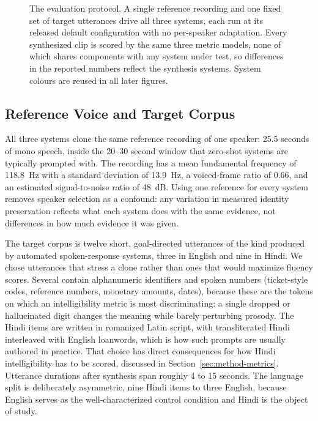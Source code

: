 \documentclass[conference]{IEEEtran}
\begin{document}
\begin{figure}[t]
\caption{The evaluation protocol. A single reference recording and one fixed
set of target utterances drive all three systems, each run at its released
default configuration with no per-speaker adaptation. Every synthesized clip
is scored by the same three metric models, none of which shares components
with any system under test, so differences in the reported numbers reflect
the synthesis systems. System colours are reused in all later figures.}
\label{fig:pipeline}
\end{figure}

\subsection{Reference Voice and Target Corpus}
\label{sec:method-corpus}

All three systems clone the same reference recording of one speaker: 25.5
seconds of mono speech, inside the 20--30 second window that zero-shot
systems are typically prompted with. The recording has a mean fundamental
frequency of 118.8~Hz with a standard deviation of 13.9~Hz, a voiced-frame
ratio of 0.66, and an estimated signal-to-noise ratio of 48~dB. Using one
reference for every system removes speaker selection as a confound: any
variation in measured identity preservation reflects what each system does
with the same evidence, not differences in how much evidence it was given.

The target corpus is twelve short, goal-directed utterances of the kind
produced by automated spoken-response systems, three in English and nine in
Hindi. We chose utterances that stress a clone rather than ones that would
maximize fluency scores. Several contain alphanumeric identifiers and spoken
numbers (ticket-style codes, reference numbers, monetary amounts, dates),
because these are the tokens on which an intelligibility metric is most
discriminating: a single dropped or hallucinated digit changes the meaning
while barely perturbing prosody. The Hindi items are written in romanized
Latin script, with transliterated Hindi interleaved with English loanwords,
which is how such prompts are usually authored in practice. That choice has
direct consequences for how Hindi intelligibility has to be scored, discussed
in Section~\ref{sec:method-metrics}. Utterance durations after synthesis span
roughly 4 to 15 seconds. The language split is deliberately asymmetric, nine
Hindi items to three English, because English serves as the
well-characterized control condition and Hindi is the object of study.
\end{document}
